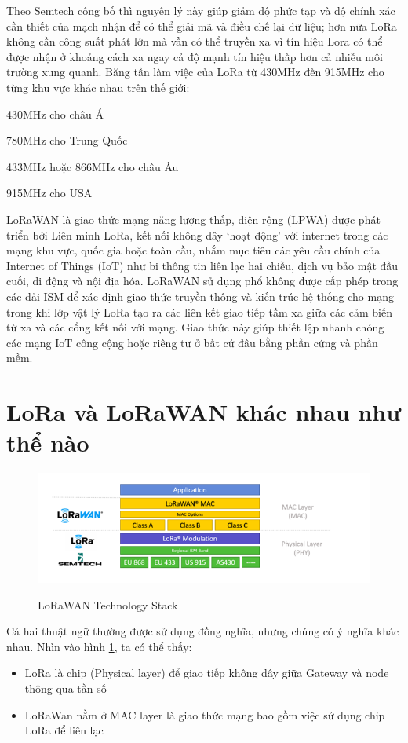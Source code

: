 Theo Semtech công bố thì nguyên lý này giúp giảm độ phức tạp và độ chính xác cần thiết của mạch nhận để có thể giải mã và điều chế lại dữ liệu; hơn nữa LoRa không cần công suất phát lớn mà vẫn có thể truyền xa vì tín hiệu Lora có thể được nhận ở khoảng cách xa ngay cả độ mạnh tín hiệu thấp hơn cả nhiễu môi trường xung quanh.
Băng tần làm việc của LoRa từ 430MHz đến 915MHz cho từng khu vực khác nhau trên thế giới:

430MHz cho châu Á

780MHz cho Trung Quốc

433MHz hoặc 866MHz cho châu Âu

915MHz cho USA

LoRaWAN là giao thức mạng năng lượng thấp, diện rộng (LPWA) được phát triển bởi Liên minh LoRa, kết nối không dây ‘hoạt động’ với internet trong các mạng khu vực, quốc gia hoặc toàn cầu, nhắm mục tiêu các yêu cầu chính của Internet of Things (IoT) như bi thông tin liên lạc hai chiều, dịch vụ bảo mật đầu cuối, di động và nội địa hóa.
LoRaWAN sử dụng phổ không được cấp phép trong các dải ISM để xác định giao thức truyền thông và kiến ​​trúc hệ thống cho mạng trong khi lớp vật lý LoRa tạo ra các liên kết giao tiếp tầm xa giữa các cảm biến từ xa và các cổng kết nối với mạng. Giao thức này giúp thiết lập nhanh chóng các mạng IoT công cộng hoặc riêng tư ở bất cứ đâu bằng phần cứng và phần mềm.

\section{LoRa và LoRaWAN khác nhau như thể nào}

\begin{figure}[H]
    \includegraphics[width=\textwidth]{images/Quanh/LoraWan_Stack.png}
    \caption{LoRaWAN Technology Stack} \cite{lorawanoverview}
    \label{fig:lorawan_stack}
\end{figure}

Cả hai thuật ngữ thường được sử dụng đồng nghĩa, nhưng chúng có ý nghĩa khác nhau. Nhìn vào hình \ref{fig:lorawan_stack}, ta có thể thấy:
\begin{itemize}
    \item LoRa là chip (Physical layer) để giao tiếp không dây giữa Gateway và node thông qua tần số
    \item LoRaWan nằm ở MAC layer là giao thức mạng bao gồm việc sử dụng chip LoRa để liên lạc
\end{itemize}

